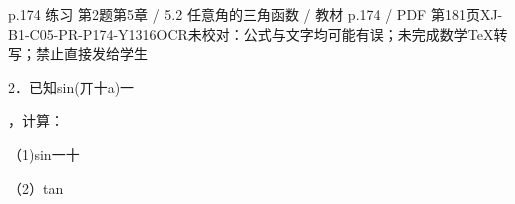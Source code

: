 \begin{bankitem}{p.174 练习 第2题}{第5章 / 5.2 任意角的三角函数 / 教材 p.174 / PDF 第181页}{XJ-B1-C05-PR-P174-Y1316}{OCR未校对：公式与文字均可能有误；未完成数学TeX转写；禁止直接发给学生}
\begin{ocrdraft}
\par
2．已知sin(丌十a)一
\par
，计算：
\par
（1)sin一十
\par
（2）tan
\end{ocrdraft}
\end{bankitem}
